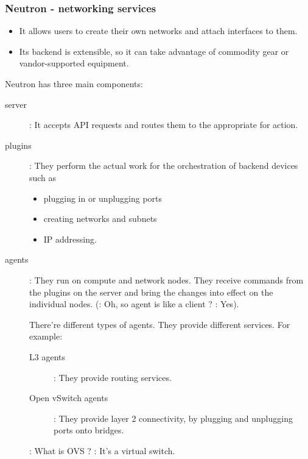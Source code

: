 \subsubsection{Neutron - networking services}




\begin{itemize}
\item It allows users to create their own networks and attach interfaces to them.
\item Its backend is extensible, so it can take advantage of commodity gear or
  vandor-supported equipment.
\end{itemize}

Neutron has three main components:

\begin{description}
\item[server] : It accepts API requests and routes them to the appropriate
   for action.
\item[plugins] : They perform the actual work for the orchestration of backend devices such as
  \begin{itemize}
  \item plugging in or unplugging ports
  \item creating networks and subnets
  \item IP addressing.
  \end{itemize}
\item[agents] : They run on compute and network nodes. They receive commands
  from the plugins on the server and bring the changes into effect on the
  individual nodes. (: Oh, so agent is like a client ?
  : Yes).

  There're different types of agents. They provide different services. For example:
  \begin{description}
  \item[L3 agents] : They provide routing services.
  \item[Open vSwitch agents] : They provide layer 2 connectivity, by plugging
    and unplugging ports onto  bridges.
  \end{description}
  : What is OVS ? : It's a virtual switch.

\end{description}


